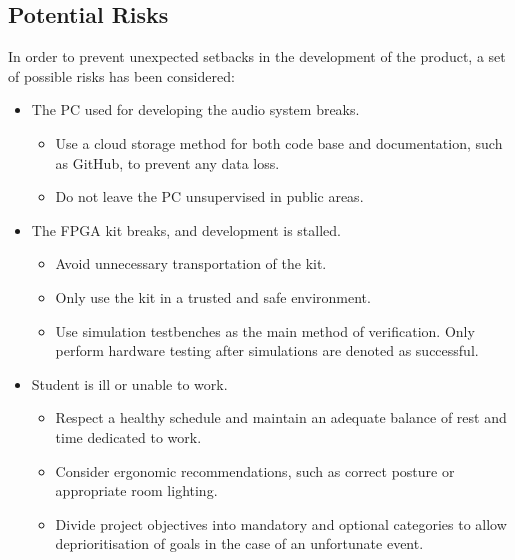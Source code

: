 
\subsection*{Potential Risks}
In order to prevent unexpected setbacks in the development of the product, a set of possible risks has been considered:
\begin{itemize}
    \item The PC used for developing the audio system breaks.
    \begin{itemize}
        \item Use a cloud storage method for both code base and documentation, such as GitHub, to prevent any data loss.
        \item Do not leave the PC unsupervised in public areas.
    \end{itemize}
    \item The FPGA kit breaks, and development is stalled.
    \begin{itemize}
        \item Avoid unnecessary transportation of the kit.
        \item Only use the kit in a trusted and safe environment.
        \item Use simulation testbenches as the main method of verification. Only perform hardware testing after simulations are denoted as successful.
    \end{itemize}
    \item Student is ill or unable to work.
    \begin{itemize}
        \item Respect a healthy schedule and maintain an adequate balance of rest and time dedicated to work.
        \item Consider ergonomic recommendations, such as correct posture or appropriate room lighting.
        \item Divide project objectives into mandatory and optional categories to allow deprioritisation of goals in the case of an unfortunate event.
    \end{itemize}
\end{itemize}


